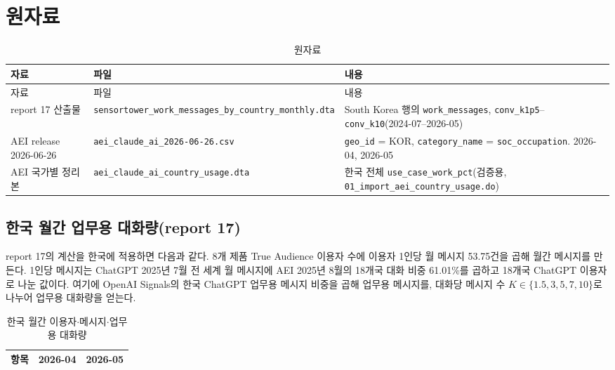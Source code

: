 \documentclass[11pt]{article}
\begin{document}
\section{원자료}

\begin{longtable}{L{3.0cm}L{5.4cm}L{7.4cm}}
\caption{원자료}\label{tab:raw}\\
\toprule
자료 & 파일 & 내용 \\
\midrule
\endfirsthead
\toprule
자료 & 파일 & 내용 \\
\midrule
\endhead
report 17 산출물 & \texttt{sensortower\_work\_messages\_by\_country\_monthly.dta} & South Korea 행의 \texttt{work\_messages}, \texttt{conv\_k1p5}--\texttt{conv\_k10}(2024-07--2026-05) \\
AEI release 2026-06-26 & \texttt{aei\_claude\_ai\_2026-06-26.csv} & \texttt{geo\_id} = KOR, \texttt{category\_name} = \texttt{soc\_occupation}. 2026-04, 2026-05 \\
AEI 국가별 정리본 & \texttt{aei\_claude\_ai\_country\_usage.dta} & 한국 전체 \texttt{use\_case\_work\_pct}(검증용, \texttt{01\_import\_aei\_country\_usage.do}) \\
\bottomrule
\end{longtable}

\subsection{한국 월간 업무용 대화량(report 17)}
report 17의 계산을 한국에 적용하면 다음과 같다. 8개 제품 True Audience 이용자 수\parencite{sensortower-2026-state-of-ai}에 이용자 1인당 월 메시지 53.75건을 곱해 월간 메시지를 만든다. 1인당 메시지는 ChatGPT 2025년 7월 전 세계 월 메시지\parencite{chatterji-2025-how-people-use-chatgpt}에 AEI 2025년 8월의 18개국 대화 비중 61.01\%\parencite{appel-2025-uneven-geographic-and-enterprise-ai}를 곱하고 18개국 ChatGPT 이용자로 나눈 값이다. 여기에 OpenAI Signals의 한국 ChatGPT 업무용 메시지 비중\parencite{openai-2026-signals-v2}을 곱해 업무용 메시지를, 대화당 메시지 수 $K \in \{1.5, 3, 5, 7, 10\}$로 나누어 업무용 대화량을 얻는다.

\begin{table}[h]
\centering
\caption{한국 월간 이용자$\cdot$메시지$\cdot$업무용 대화량}\label{tab:korea}
\begin{tabular}{lrr}
\toprule
항목 & 2026-04 & 2026-05 \\
\midrule

\bottomrule
\end{tabular}
\end{table}
\end{document}
